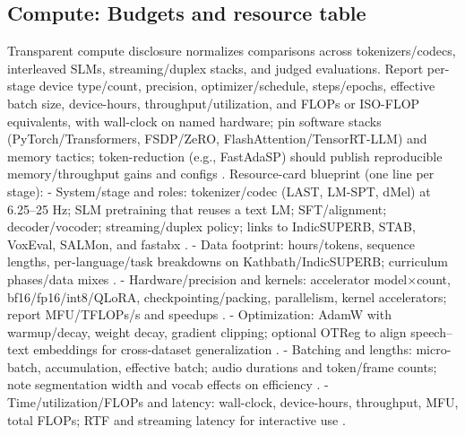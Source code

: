 \subsection{Compute: Budgets and resource table} \label{subsec:Compute: Budgets and resource table}
Transparent compute disclosure normalizes comparisons across tokenizers/codecs, interleaved SLMs, streaming/duplex stacks, and judged evaluations. Report per-stage device type/count, precision, optimizer/schedule, steps/epochs, effective batch size, device-hours, throughput/utilization, and FLOPs or ISO-FLOP equivalents, with wall-clock on named hardware; pin software stacks (PyTorch/Transformers, FSDP/ZeRO, FlashAttention/TensorRT-LLM) and memory tactics; token-reduction (e.g., FastAdaSP) should publish reproducible memory/throughput gains and configs \cite{maimon2025slammingtrainingspeechlanguagemodelonegp,chen2023reducingbarriersselfsupervisedlearninghu,lu2024fastadaspmultitaskadaptedefficientinfere}. Resource-card blueprint (one line per stage):
- System/stage and roles: tokenizer/codec (LAST, LM-SPT, dMel) at 6.25–25 Hz; SLM pretraining that reuses a text LM; SFT/alignment; decoder/vocoder; streaming/duplex policy; links to IndicSUPERB, STAB, VoxEval, SALMon, and fastabx \cite{turetzky2024lastlanguagemodelawarespeechtokenization,jo2025lmsptalignedsemanticdistillationspeechto,bai2025dmelspeechtokenizationmadesimple,vashishth2024stabspeechtokenizerassessmentbenchmark,cui2025voxevalbenchmarkingknowledgeunderstandin,maimon2025salmonsuiteacousticlanguagemodelevaluati,poli2025fastabxlibraryefficientcomputationabxdis}.
- Data footprint: hours/tokens, sequence lengths, per-language/task breakdowns on Kathbath/IndicSUPERB; curriculum phases/data mixes \cite{entry2025indicsuperbspeechprocessinguniversalperf}.
- Hardware/precision and kernels: accelerator model×count, bf16/fp16/int8/QLoRA, checkpointing/packing, parallelism, kernel accelerators; report MFU/TFLOPs/s and speedups \cite{maimon2025scalinganalysisinterleavedspeechtextlang,lu2024fastadaspmultitaskadaptedefficientinfere}.
- Optimization: AdamW with warmup/decay, weight decay, gradient clipping; optional OTReg to align speech–text embeddings for cross-dataset generalization \cite{xu2025optimaltransportregularizationspeechtext}.
- Batching and lengths: micro-batch, accumulation, effective batch; audio durations and token/frame counts; note segmentation width and vocab effects on efficiency \cite{turetzky2024lastlanguagemodelawarespeechtokenization}.
- Time/utilization/FLOPs and latency: wall-clock, device-hours, throughput, MFU, total FLOPs; RTF and streaming latency for interactive use \cite{maimon2025slammingtrainingspeechlanguagemodelonegp,entry2025indicsuperbspeechprocessinguniversalperf}.
